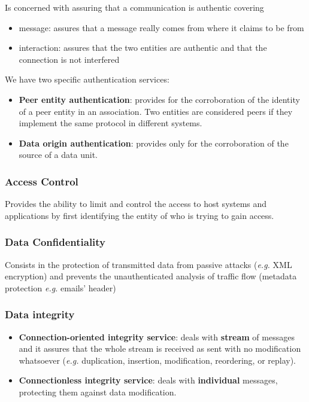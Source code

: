 \documentclass[oneside]{academica}
\begin{document}
Is concerned with assuring that a communication is authentic covering
\begin{itemize}
  \item message: assures that a message really comes from where it claims to be from
  \item interaction: assures that the two entities are authentic and that the connection is not interfered
\end{itemize}
We have two specific authentication services:
\begin{itemize}
  \item \textbf{Peer entity authentication}: provides for the corroboration of the identity of a peer entity in an association. Two entities are considered peers if they implement the same protocol in different systems.
  \item \textbf{Data origin authentication}: provides only for the corroboration of the source of a data unit.
\end{itemize}

\subsubsection{Access Control}

Provides the ability to limit and control the access to host systems and applications by first identifying the entity of who is trying to gain access.

\subsubsection{Data Confidentiality}

Consists in the protection of transmitted data from passive attacks (\textit{e.g.} XML encryption) and prevents the unauthenticated analysis of traffic flow (metadata protection \textit{e.g.} emails' header)

\subsubsection{Data integrity}

\begin{itemize}
  \item \textbf{Connection-oriented integrity service}: deals with \textbf{stream} of messages and it assures that the whole stream is received as sent with no modification whatsoever (\textit{e.g.} duplication, insertion, modification, reordering, or replay).
  \item \textbf{Connectionless integrity service}: deals with \textbf{individual} messages, protecting them against data modification.
\end{itemize}
\end{document}
